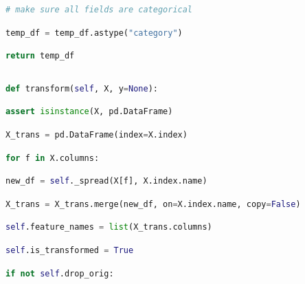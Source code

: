 \documentclass[
  11pt,
  a4paper,
  DIV=12,captions=tableheading,oneside]{scrbook}
\begin{document}
\begin{lstlisting}[language=Python,stepnumber=2,basicstyle=\footnotesize]
        # make sure all fields are categorical\end{lstlisting}
\begin{lstlisting}[language=Python,stepnumber=2,basicstyle=\footnotesize]
        temp_df = temp_df.astype("category")\end{lstlisting}
\begin{lstlisting}[language=Python,stepnumber=2,basicstyle=\footnotesize]
        return temp_df\end{lstlisting}
\begin{lstlisting}[language=Python,stepnumber=2,basicstyle=\footnotesize]
\end{lstlisting}
\begin{lstlisting}[language=Python,stepnumber=2,basicstyle=\footnotesize]
    def transform(self, X, y=None):\end{lstlisting}
\begin{lstlisting}[language=Python,stepnumber=2,basicstyle=\footnotesize]
        assert isinstance(X, pd.DataFrame)\end{lstlisting}
\begin{lstlisting}[language=Python,stepnumber=2,basicstyle=\footnotesize]
        X_trans = pd.DataFrame(index=X.index)\end{lstlisting}
\begin{lstlisting}[language=Python,stepnumber=2,basicstyle=\footnotesize]
        for f in X.columns:\end{lstlisting}
\begin{lstlisting}[language=Python,stepnumber=2,basicstyle=\footnotesize]
            new_df = self._spread(X[f], X.index.name)\end{lstlisting}
\begin{lstlisting}[language=Python,stepnumber=2,basicstyle=\footnotesize]
            X_trans = X_trans.merge(new_df, on=X.index.name, copy=False)\end{lstlisting}
\begin{lstlisting}[language=Python,stepnumber=2,basicstyle=\footnotesize]
        self.feature_names = list(X_trans.columns)\end{lstlisting}
\begin{lstlisting}[language=Python,stepnumber=2,basicstyle=\footnotesize]
        self.is_transformed = True\end{lstlisting}
\begin{lstlisting}[language=Python,stepnumber=2,basicstyle=\footnotesize]
        if not self.drop_orig:\end{lstlisting}
\end{document}
